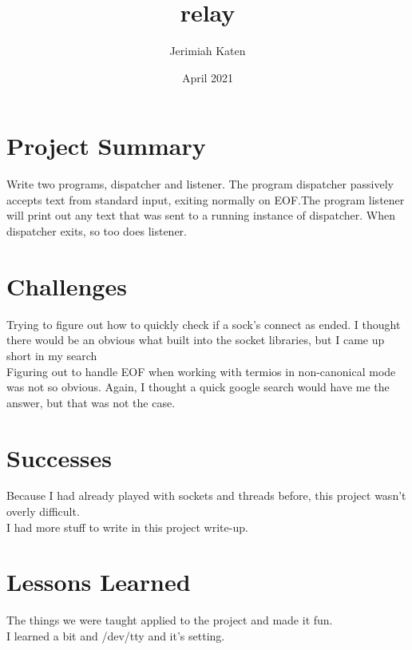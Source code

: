 \documentclass{article}
\title{relay}
\author{Jerimiah Katen}
\date{April 2021}
\begin{document}
\maketitle

\section{Project Summary}

Write two programs, dispatcher and listener. The program dispatcher passively accepts text from standard input, exiting normally on EOF.The program listener will print out any text that was sent to a running instance of dispatcher. When dispatcher exits, so too does listener.


\section{Challenges}

Trying to figure out how to quickly check if a sock's connect as ended. I thought there would be an obvious what built into the socket libraries, but I came up short in my search
\\[.5cm]
Figuring out to handle EOF when working with termios in non-canonical mode was not so obvious. Again, I thought a quick google search would have me the answer, but that was not the case.


\section{Successes}
Because I had already played with sockets and threads before, this project wasn't overly difficult.
\\[.5cm]
I had more stuff to write in this project write-up.


\section{Lessons Learned}
The things we were taught applied to the project and made it fun.
\\[.5cm]
I learned a bit and /dev/tty and it's setting.
\end{document}
